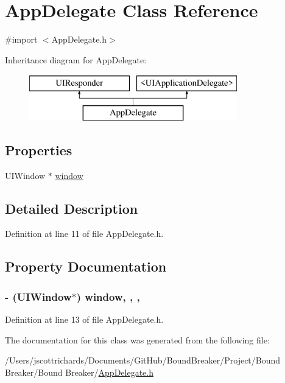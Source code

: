 \hypertarget{interface_app_delegate}{}\section{App\+Delegate Class Reference}
\label{interface_app_delegate}


{\ttfamily \#import $<$App\+Delegate.\+h$>$}

Inheritance diagram for App\+Delegate\+:\begin{figure}[H]
\begin{center}
\leavevmode
\includegraphics[height=2.000000cm]{interface_app_delegate}
\end{center}
\end{figure}
\subsection*{Properties}
\begin{DoxyCompactItemize}
\item 
U\+I\+Window $\ast$ \hyperlink{interface_app_delegate_acf48ac24125e688cac1a85445cd7fac2}{window}
\end{DoxyCompactItemize}


\subsection{Detailed Description}


Definition at line 11 of file App\+Delegate.\+h.



\subsection{Property Documentation}
\hypertarget{interface_app_delegate_acf48ac24125e688cac1a85445cd7fac2}{}
\subsubsection[{window}]{\setlength{\rightskip}{0pt plus 5cm}-\/ (U\+I\+Window$\ast$) window\hspace{0.3cm}{\ttfamily [read]}, {\ttfamily [write]}, {\ttfamily [nonatomic]}, {\ttfamily [strong]}}\label{interface_app_delegate_acf48ac24125e688cac1a85445cd7fac2}


Definition at line 13 of file App\+Delegate.\+h.



The documentation for this class was generated from the following file\+:\begin{DoxyCompactItemize}
\item 
/\+Users/jscottrichards/\+Documents/\+Git\+Hub/\+Bound\+Breaker/\+Project/\+Bound Breaker/\+Bound Breaker/\hyperlink{_app_delegate_8h}{App\+Delegate.\+h}\end{DoxyCompactItemize}
